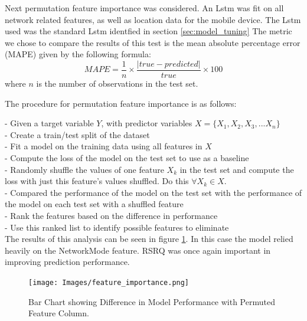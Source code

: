 Next permutation feature importance was considered. An Lstm was fit on all network related features, as well as location data for the mobile device. The Lstm used was the standard Lstm identfied in section \ref{sec:model_tuning} The metric we chose to compare the results of this test is the mean absolute percentage error (MAPE) given by the following formula: \\

\begin{equation}
MAPE = \frac{1}{n} \times \frac{\left|true-predicted\right|}{true} \times 100
\end{equation}
where $n$ is the number of observations in the test set.

The procedure for permutation feature importance is as follows:

- Given a target variable $Y$, with predictor variables $X=\{X_1,X_2,X_3,...X_n\}$ \\
- Create a train/test split of the dataset \\
- Fit a model on the training data using all features in $X$ \\
- Compute the loss of the model on the test set to use as a baseline \\
- Randomly shuffle the values of one feature $X_k$ in the test set and compute the loss with just this feature's values shuffled. Do this $\forall X_k \in X$. \\
- Compared the performance of the model on the test set with the performance of the model on each test set with a shuffled feature \\
- Rank the features based on the difference in performance \\
- Use this ranked list to identify possible features to eliminate \\

The results of this analysis can be seen in figure \ref{fig:feature_importance}. In this case the model relied heavily on the NetworkMode feature. RSRQ was once again important in improving prediction performance. 
\newpage
\begin{figure}[h]
\texttt{[image: Images/feature\_importance.png]}
\centering
\caption{Bar Chart showing Difference in Model Performance with Permuted Feature Column.}
\label{fig:feature_importance}
\end{figure}